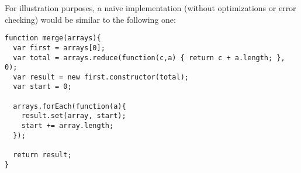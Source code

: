 For illustration purposes, a naive implementation (without optimizations or error checking) would be similar to the following one:
\begin{lstlisting}[caption=Simple \ttarray{} merge function]
function merge(arrays){
  var first = arrays[0];
  var total = arrays.reduce(function(c,a) { return c + a.length; }, 0);
  var result = new first.constructor(total);
  var start = 0;

  arrays.forEach(function(a){
    result.set(array, start);
    start += array.length;
  });

  return result;
}
\end{lstlisting}

\pagebreak